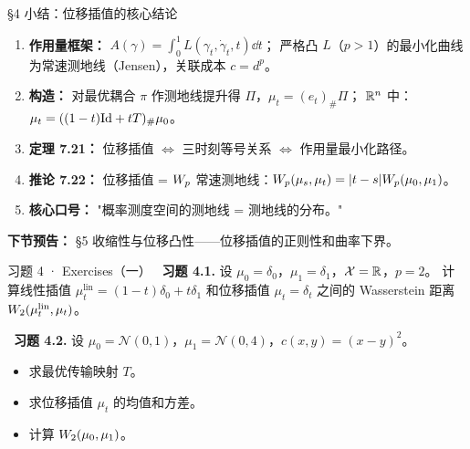 \begin{frame}{§4 小结：位移插值的核心结论}
  \begin{enumerate}
    \item \textbf{作用量框架：} $A(\gamma)=\int_{0}^{1}L(\gamma_{t},\dot{\gamma}_{t},t)\dd t$；
    严格凸 $L$（$p>1$）的最小化曲线为常速测地线（Jensen），关联成本 $c=d^{p}$。
    \item \textbf{构造：} 对最优耦合 $\pi$ 作测地线提升得 $\Pi$，$\mu_{t}=(e_{t})_{\#}\Pi$；
    $\mathbb{R}^{n}$ 中：$\mu_{t}=((1-t)\mathrm{Id}+tT)_{\#}\mu_{0}$。
    \item \textbf{定理 7.21：} 位移插值 $\iff$ 三时刻等号关系 $\iff$ 作用量最小化路径。
    \item \textbf{推论 7.22：} 位移插值 = $W_{p}$ 常速测地线：$W_{p}(\mu_{s},\mu_{t})=|t-s|W_{p}(\mu_{0},\mu_{1})$。
    \item \textbf{核心口号：} "概率测度空间的测地线 = 测地线的分布。"
  \end{enumerate}

  \textbf{下节预告：} §5 收缩性与位移凸性——位移插值的正则性和曲率下界。

\end{frame}

\begin{frame}{习题 4 · Exercises（一）}
  \diffI\ \textbf{习题 4.1.} 设 $\mu_{0}=\delta_{0}$，$\mu_{1}=\delta_{1}$，$\mathcal{X}=\mathbb{R}$，$p=2$。
  计算线性插值 $\mu_{t}^{\mathrm{lin}}=(1-t)\delta_{0}+t\delta_{1}$ 和位移插值 $\mu_{t}=\delta_{t}$ 之间的
  Wasserstein 距离 $W_{2}(\mu_{t}^{\mathrm{lin}},\mu_{t})$。


  \vspace{6pt}
  \diffII\ \textbf{习题 4.2.} 设 $\mu_{0}=\mathcal{N}(0,1)$，$\mu_{1}=\mathcal{N}(0,4)$，$c(x,y)=(x-y)^{2}$。
  \begin{itemize}
    \item[(a)] 求最优传输映射 $T$。
    \item[(b)] 求位移插值 $\mu_{t}$ 的均值和方差。
    \item[(c)] 计算 $W_{2}(\mu_{0},\mu_{1})$。
  \end{itemize}

\end{frame}

